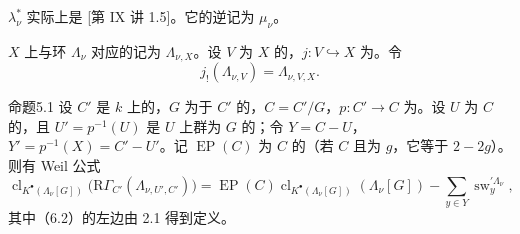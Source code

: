  $\lambda_\nu^*$ 实际上是 [第 IX 讲 1.5]。它的逆记为 $\mu_\nu$。

 $X$ 上与环 $\Lambda_\nu$ 对应的记为 $\Lambda_{\nu,X}$。设 $V$ 为 $X$ 的，$j:V\hookrightarrow X$ 为。令
\[
j_!(\Lambda_{\nu,V})=\Lambda_{\nu,V,X}.
\]

\begin{SGAresult}{命题}{5.1}
设 $C'$ 是 $k$ 上的，$G$ 为于 $C'$ 的，$C=C'/G$，$p:C'\longrightarrow C$ 为。设 $U$ 为 $C$ 的，且 $U'=p^{-1}(U)$ 是 $U$ 上群为 $G$ 的；令 $Y=C-U$，$Y'=p^{-1}(X)=C'-U'$。记 $\operatorname{EP}(C)$ 为 $C$ 的（若 $C$ 且为 $g$，它等于 $2-2g$）。则有 Weil 公式
\[
\operatorname{cl}_{K^\bullet(\Lambda_\nu[G])}
\bigl(\mathrm R\Gamma_{C'}(\Lambda_{\nu,U',C'})\bigr)
=\operatorname{EP}(C)\operatorname{cl}_{K^\bullet(\Lambda_\nu[G])}(\Lambda_\nu[G])
-\sum_{y\in Y}\operatorname{sw}_y^{\prime\Lambda_\nu},\tag{5.2}
\]
其中（6.2）的左边由 2.1 得到定义。
\end{SGAresult}
